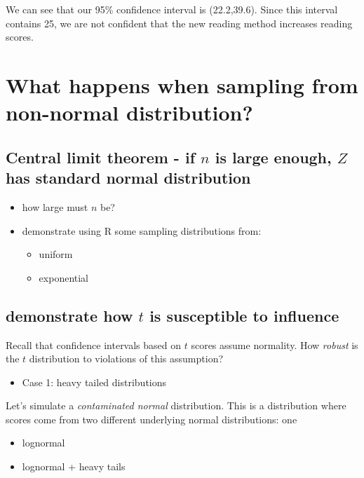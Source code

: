 \documentclass[11pt]{article}
\begin{document}
We can see that our 95\% confidence interval is (22.2,39.6).  Since this interval contains 25, we are not confident that the new reading method increases reading scores.


\section*{What happens when sampling from non-normal distribution?}
\label{sec-3}
\subsection*{Central limit theorem - if $n$ is large enough, $Z$ has standard normal distribution}
\label{sec-3-1}
\begin{itemize}
\item how large must $n$ be?
\item demonstrate using R some sampling distributions from:
\begin{itemize}
\item uniform
\item exponential
\end{itemize}
\end{itemize}

\subsection*{demonstrate how $t$ is susceptible to influence}
\label{sec-3-2}
Recall that confidence intervals based on $t$ scores assume normality.  How \emph{robust} is the $t$ distribution to violations of this assumption?

\begin{itemize}
\item Case 1: heavy tailed distributions
\end{itemize}

Let's simulate a \emph{contaminated normal} distribution.  This is a distribution where scores come from two different underlying normal distributions: one

\begin{itemize}
\item lognormal
\item lognormal + heavy tails
\end{itemize}
\end{document}
